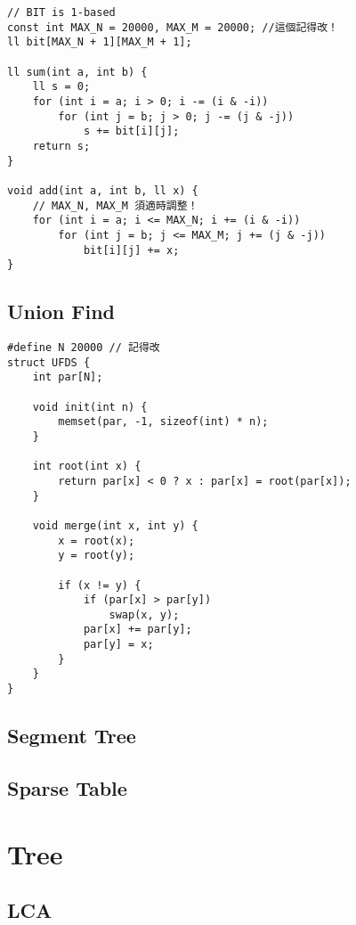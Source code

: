 \documentclass[10pt,oneside]{article}
\begin{document}
\begin{landscape}
\begin{multicols}{2}
\begin{lstlisting}
// BIT is 1-based
const int MAX_N = 20000, MAX_M = 20000; //這個記得改！
ll bit[MAX_N + 1][MAX_M + 1];

ll sum(int a, int b) {
    ll s = 0;
    for (int i = a; i > 0; i -= (i & -i))
        for (int j = b; j > 0; j -= (j & -j))
            s += bit[i][j];
    return s;
}

void add(int a, int b, ll x) {
	// MAX_N, MAX_M 須適時調整！
    for (int i = a; i <= MAX_N; i += (i & -i))
        for (int j = b; j <= MAX_M; j += (j & -j))
            bit[i][j] += x;
}
\end{lstlisting}

\subsection{Union Find}

\begin{lstlisting}
#define N 20000 // 記得改
struct UFDS {
    int par[N];

    void init(int n) {
        memset(par, -1, sizeof(int) * n);
    }

    int root(int x) {
        return par[x] < 0 ? x : par[x] = root(par[x]);
    }

    void merge(int x, int y) {
        x = root(x);
        y = root(y);

        if (x != y) {
            if (par[x] > par[y])
                swap(x, y);
            par[x] += par[y];
            par[y] = x;
        }
    }
}
\end{lstlisting}

\subsection{Segment Tree}

\subsection{Sparse Table}


\section{Tree}

\subsection{LCA}


\end{multicols}
\end{landscape}
\end{document}
